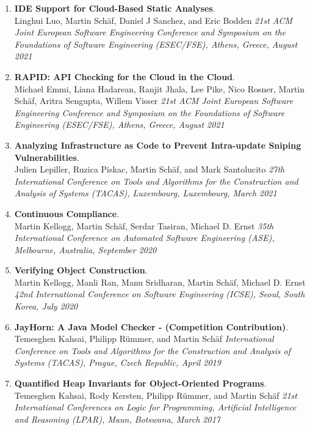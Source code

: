 \begin{enumerate}
  \item \textbf{IDE Support for Cloud-Based Static Analyses}.
  \\  Linghui Luo, Martin Schäf, Daniel J Sanchez, and Eric Bodden
  \emph{21st ACM Joint European Software Engineering Conference and Symposium on the Foundations of Software Engineering (ESEC/FSE), Athens, Greece, August 2021}

  \item \textbf{RAPID: API Checking for the Cloud in the Cloud}.
  \\  Michael Emmi, Liana Hadarean, Ranjit Jhala, Lee Pike, Nico Rosner, Martin Schäf, Aritra Sengupta, Willem Visser
  \emph{21st ACM Joint European Software Engineering Conference and Symposium on the Foundations of Software Engineering (ESEC/FSE), Athens, Greece, August 2021}

  \item \textbf{Analyzing Infrastructure as Code to Prevent Intra-update Sniping Vulnerabilities}.
  \\  Julien Lepiller, Ruzica Piskac, Martin Schäf, and Mark Santolucito
  \emph{27th International Conference on Tools and Algorithms for the Construction and Analysis of Systems (TACAS), Luxembourg, Luxembourg, March 2021}

  \item \textbf{Continuous Compliance}.
  \\  Martin Kellogg, Martin Schäf, Serdar Tasiran, Michael D. Ernst
  \emph{35th International Conference on Automated Software Engineering (ASE), Melbourne, Australia, September 2020}

  \item \textbf{Verifying Object Construction}.
  \\  Martin Kellogg, Manli Ran, Manu Sridharan, Martin Schäf, Michael D. Ernst
  \emph{42nd International Conference on Software Engineering (ICSE), Seoul, South Korea, July 2020}

  \item \textbf{JayHorn: A Java Model Checker - (Competition Contribution)}.
  \\  Temesghen Kahsai, Philipp Rümmer, and Martin Schäf
  \emph{International Conference on Tools and Algorithms for the Construction and Analysis of Systems (TACAS), Prague, Czech Republic, April 2019}

  \item \textbf{Quantified Heap Invariants for Object-Oriented Programs}.
  \\  Temesghen Kahsai, Rody Kersten, Philipp Rümmer, and Martin Schäf
  \emph{21st International Conferences on Logic for Programming, Artificial Intelligence and Reasoning (LPAR), Maun, Botswana, March 2017}


\end{enumerate}
